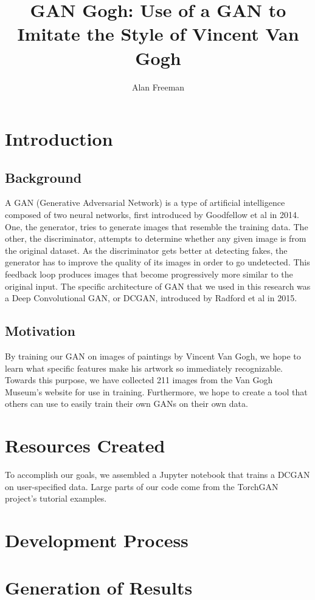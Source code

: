 \documentclass[12pt,letterpaper]{article}
\author{Alan Freeman}
\title{GAN Gogh: Use of a GAN to Imitate the Style of Vincent Van Gogh}
\begin{document}
	\maketitle
	\section{Introduction}
		\subsection{Background}
			A GAN (Generative Adversarial Network) is a type of artificial intelligence composed of two neural networks, first introduced by Goodfellow et al in 2014.\cite{NIPS2014_5ca3e9b1}
			One, the generator, tries to generate images that resemble the training data.
			The other, the discriminator, attempts to determine whether any given image is from the original dataset.
			As the discriminator gets better at detecting fakes, the generator has to improve the quality of its images in order to go undetected.
			This feedback loop produces images that become progressively more similar to the original input.
			The specific architecture of GAN that we used in this research was a Deep Convolutional GAN, or DCGAN, introduced by Radford et al in 2015.\cite{radford2015unsupervised}
		\subsection{Motivation}
			By training our GAN on images of paintings by Vincent Van Gogh, we hope to learn what specific features make his artwork so immediately recognizable.
			Towards this purpose, we have collected 211 images from the Van Gogh Museum's website for use in training.
			Furthermore, we hope to create a tool that others can use to easily train their own GANs on their own data.

	\section{Resources Created}
		To accomplish our goals, we assembled a Jupyter notebook that trains a DCGAN on user-specified data.
		Large parts of our code come from the TorchGAN\cite{pal2019torchgan} project's tutorial examples.


	\section{Development Process}

	\section{Generation of Results}
\end{document}
